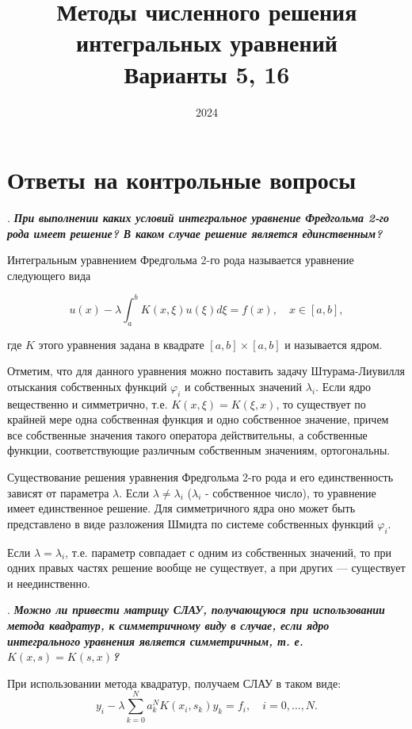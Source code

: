 \documentclass[12pt, a4paper]{article}
\title{Методы численного решения интегральных уравнений \\ Варианты 5, 16}
\date{2024}
\renewcommand{\phi}{\varphi}
\newcounter{mycounter}
\newcommand{\question}[1]{%
	\stepcounter{mycounter}%
	\textbf{\themycounter}.  %
	\textbf{\textit{#1}}
	
}
\begin{document}
	\maketitle
	\section{Ответы на контрольные вопросы}
	
	\question{При выполнении каких условий интегральное уравнение Фредгольма 2-го рода имеет решение? В каком случае решение является единственным?}	
	Интегральным уравнением Фредгольма 2-го рода называется уравнение следующего вида 
	
	\begin{equation}
		u(x) - \lambda \int_a^b K(x, \xi) u(\xi) d\xi = f(x), \quad x \in [a, b],
		\label{1}
	\end{equation}
	
	где $K$ этого уравнения задана в квадрате $[a, b] \times [a, b]$ и называется ядром.
	
 	Отметим, что для данного уравнения можно поставить задачу Штурама-Лиувилля отыскания собственных функций $\phi_i$ и собственных значений $\lambda_i$. Если ядро вещественно и симметрично, т.е. $K(x, \xi) = K(\xi, x)$, то существует по крайней мере одна собственная функция и одно собственное значение, причем все собственные значения такого оператора действительны, а собственные функции, соответствующие различным собственным значениям, ортогональны.
 
 	Существование решения уравнения Фредгольма 2-го рода и его единственность зависят от параметра $\lambda$. Если $\lambda \neq \lambda_i$ ($\lambda_i$ - собственное число), то уравнение имеет единственное решение. Для симметричного ядра оно может быть представлено в виде разложения Шмидта по системе собственных функций $\varphi_i$.
 	
 	Если $\lambda = \lambda_i$, т.е. параметр совпадает с одним из собственных значений, то при одних правых частях решение вообще не существует, а при других — существует и неединственно.

	
	\bigskip
	\question{Можно ли привести матрицу СЛАУ, получающуюся при использовании метода квадратур, к симметричному виду в случае, если ядро интегрального уравнения является симметричным, т. е. $K(x, s) = K(s, x)$?}
	
	При использовании метода квадратур, получаем СЛАУ в таком виде:
	\begin{equation}
		y_i - \lambda \sum_{k=0}^{N} a_k^N K(x_i, s_k) y_k = f_i, \quad i = 0, \ldots, N.
	\end{equation}
	
\end{document}

